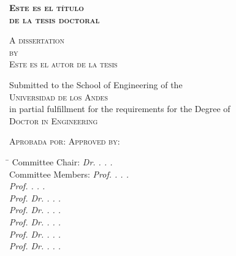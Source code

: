 \begin{center}
{%
  \LARGE\scshape\bfseries%
  Este es el t\'{i}tulo \\ [6pt]
  de la tesis doctoral \\ [6pt]
}

\vfill

{
 \large\scshape%
  A dissertation\\
  by\\
  Este es el autor de la tesis
}

\vfill

{%
  {\normalfont Submitted to the School of Engineering of the}\\[3pt]
  {\large\scshape Universidad de los Andes}\\[3pt]
  {\normalfont in partial fulfillment for the requirements for the Degree of}\\[3pt]
  {\large\scshape Doctor in Engineering}
}

\vfill

\makeatletter
  \iftui@spanish
    {\scshape Aprobada por:}
  \else
    {\scshape Approved by:}
  \fi
\makeatother


\begin{tabbing}
  \hspace{6.5cm}\=\kill
  \hspace{1cm}Committee Chair:    \> {\itshape Dr. . . . } \\
  \hspace{1cm}Committee Members:  \> {\itshape Prof. . . . } \\
  			    											 \> {\itshape Prof. . . . } \\
                                  \> {\itshape Prof. Dr. . . . } \\
                                  \> {\itshape Prof. Dr. . . . } \\
                                  \> {\itshape Prof. Dr. . . . } \\
                                  \> {\itshape Prof. Dr. . . . } \\
                                  \> {\itshape Prof. Dr. . . . } \\
                                  

\end{tabbing}
\end{center}

